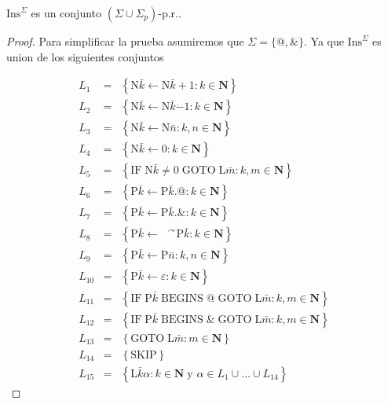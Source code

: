   \begin{lemma}
    $\mathrm{Ins}^{\Sigma }$ es un conjunto $(\Sigma \cup \Sigma _{p})$-p.r..
  \begin{proof}
    Para simplificar la prueba asumiremos que $\Sigma =\{@,\& \}$. Ya que $ \mathrm{Ins}^{\Sigma }$ es union de los
    siguientes conjuntos

    \[
      \displaystyle
      \begin{array}{rcl}
        L_{1} & =& \left\{ \mathrm{N}\bar{k}\leftarrow \mathrm{N}\bar{k}+1:k\in \mathbf{N}\right\} \\
        L_{2} & =& \left\{ \mathrm{N}\bar{k}\leftarrow \mathrm{N}\bar{k}\dot{-}1:k\in \mathbf{N}\right\} \\
        L_{3} & =& \left\{ \mathrm{N}\bar{k}\leftarrow \mathrm{N}\bar{n}:k,n\in \mathbf{N}\right\} \\
        L_{4} & =& \left\{ \mathrm{N}\bar{k}\leftarrow 0:k\in \mathbf{N}\right\} \\
        L_{5} & =& \left\{ \mathrm{IF}\;\mathrm{N}\bar{k}\neq 0\;\mathrm{GOTO}\;
                           \mathrm{L}\bar{m}:k,m\in \mathbf{N}\right\} \\
        L_{6} & =& \left\{ \mathrm{P}\bar{k}\leftarrow \mathrm{P}\bar{k}.@:k\in \mathbf{N}\right\} \\
        L_{7} & =& \left\{ \mathrm{P}\bar{k}\leftarrow \mathrm{P}\bar{k}.\& :k\in \mathbf{N}\right\} \\
        L_{8} & =& \left\{ \mathrm{P}\bar{k}\leftarrow \text{ }^{\curvearrowright }
                           \mathrm{P}\bar{k}:k\in \mathbf{N}\right\} \\
        L_{9} & =& \left\{ \mathrm{P}\bar{k}\leftarrow \mathrm{P}\bar{n}:k,n\in \mathbf{N}\right\} \\
        L_{10} & =& \left\{ \mathrm{P}\bar{k}\leftarrow \varepsilon :k\in \mathbf{N} \right\} \\
        L_{11} & =& \left\{ \mathrm{IF}\;\mathrm{P}\bar{k}\;\mathrm{BEGINS}\;@\; \mathrm{GOTO}\;
                            \mathrm{L}\bar{m}:k,m\in \mathbf{N}\right\} \\
        L_{12} & =& \left\{ \mathrm{IF}\;\mathrm{P}\bar{k}\;\mathrm{BEGINS}\;\& \; \mathrm{GOTO}\;
                            \mathrm{L}\bar{m}:k,m\in \mathbf{N}\right\} \\
        L_{13} & =& \left\{ \mathrm{GOTO}\;\mathrm{L}\bar{m}:m\in \mathbf{N}\right\} \\
        L_{14} & =& \left\{ \mathrm{SKIP}\right\} \\
        L_{15} & =& \left\{ \mathrm{L}\bar{k}\alpha :k\in \mathbf{N\;}
                            \text{y }\alpha \in L_{1}\cup ...\cup L_{14}\right\}
      \end{array}
    \]


\end{proof}
\end{lemma}
